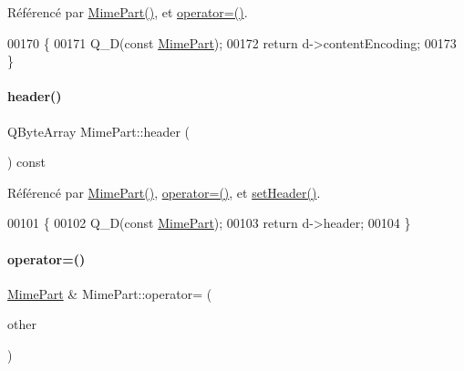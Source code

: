 Référencé par \hyperlink{class_simple_mail_1_1_mime_part_a22b25ea7c1bb06d1b73f4c43103bfa1e}{Mime\+Part()}, et \hyperlink{class_simple_mail_1_1_mime_part_a34320574f8cba9dbe03cca99e3fca942}{operator=()}.


\begin{DoxyCode}
00170 \{
00171     Q\_D(\textcolor{keyword}{const} \hyperlink{class_simple_mail_1_1_mime_part}{MimePart});
00172     \textcolor{keywordflow}{return} d->contentEncoding;
00173 \}
\end{DoxyCode}
\mbox{\label{class_simple_mail_1_1_mime_part_a87f3646cf7e63664d3d92d087afd76ae}} 
\paragraph{\texorpdfstring{header()}{header()}}
{\footnotesize\ttfamily Q\+Byte\+Array Mime\+Part\+::header (\begin{DoxyParamCaption}{ }\end{DoxyParamCaption}) const}



Référencé par \hyperlink{class_simple_mail_1_1_mime_part_a22b25ea7c1bb06d1b73f4c43103bfa1e}{Mime\+Part()}, \hyperlink{class_simple_mail_1_1_mime_part_a34320574f8cba9dbe03cca99e3fca942}{operator=()}, et \hyperlink{class_simple_mail_1_1_mime_part_ad008e68412ccd0cd4b5b69b29ce77efb}{set\+Header()}.


\begin{DoxyCode}
00101 \{
00102     Q\_D(\textcolor{keyword}{const} \hyperlink{class_simple_mail_1_1_mime_part}{MimePart});
00103     \textcolor{keywordflow}{return} d->header;
00104 \}
\end{DoxyCode}
\mbox{\label{class_simple_mail_1_1_mime_part_a34320574f8cba9dbe03cca99e3fca942}} 
\paragraph{\texorpdfstring{operator=()}{operator=()}}
{\footnotesize\ttfamily \hyperlink{class_simple_mail_1_1_mime_part}{Mime\+Part} \& Mime\+Part\+::operator= (\begin{DoxyParamCaption}\item[{const \hyperlink{class_simple_mail_1_1_mime_part}{Mime\+Part} \&}]{other }\end{DoxyParamCaption})}



